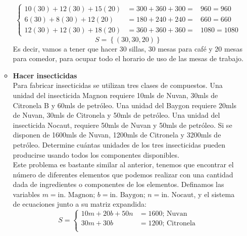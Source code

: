 \documentclass{article}
\begin{document}
\begin{enumerate}
\begin{itemize}
\[                    \left\{
                    \begin{aligned}
                        10(30) + 12(30) + 15(20) &= 300 + 360 + 300 =& 960 = 960 \\
                        6(30) + 8(30) + 12(20) &= 180 + 240 + 240 =& 660 = 660 \\
                        12(30) + 12(30) + 18(20) &= 360 + 360 + 360 =& 1080 = 1080
                    \end{aligned}
                    \right.
                \]
                \[
                    S = \left\{\left(30, 30, 20\right)\right\}
                \]
                Es decir, vamos a tener que hacer 30 sillas, 30 mesas para café y 20 mesas para comedor, para ocupar todo el horario de uso de las mesas de trabajo.

            \item \textbf{Hacer insecticidas} \\
                Para fabricar insecticidas se utilizan tres clases de compuestos. 
                Una unidad del insecticida Magnon requiere 
                    10mls de Nuvan, 
                    30mls de Citronela B y 
                    60mls de petróleo. 
                Una unidad del Baygon requiere
                    20mls de Nuvan, 
                    30mls de Citronela y 
                    50mls de petróleo. 
                Una unidad del insecticida Nocaut, requiere
                    50mls de Nuvan y
                    50mls de petróleo. 
                Si se disponen de 
                    1600mls de Nuvan,
                    1200mls de Citronela y
                    3200mls de petróleo. 
                Determine cuántas unidades de los tres insecticidas pueden producirse usando todos los componentes disponibles.
                \\[1ex]
                Este problema es bastante similar al anterior, tenemos que encontrar el número de diferentes elementos que podemos realizar con 
                una cantidad dada de ingredientes o componentes de los elementos.
                Definamos las variables \(m = \text{in. Magnon; } b = \text{in. Baygon; } n = \text{in. Nocaut}\), y el sistema de ecuaciones junto a su matriz expandida:
                \[
                    S = 
                    \left\{
                        \begin{aligned}
                            10m + 20b + 50n &= 1600 \text{; Nuvan}\\
                            30m + 30b &= 1200 \text{; Citronela}\\

\end{aligned}\]
\end{itemize}
\end{enumerate}
\end{document}
